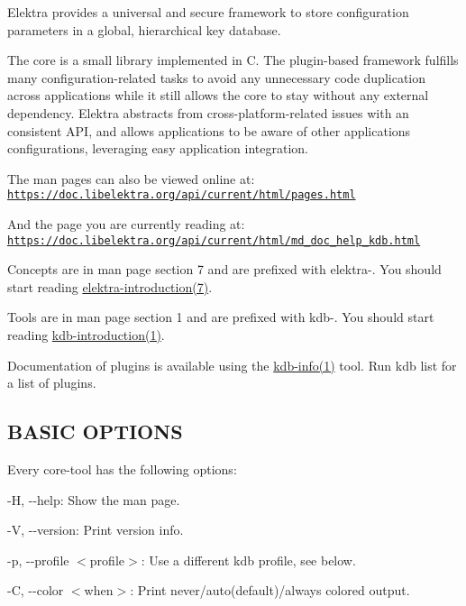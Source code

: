 Elektra provides a universal and secure framework to store configuration parameters in a global, hierarchical key database.

The core is a small library implemented in C. The plugin-\/based framework fulfills many configuration-\/related tasks to avoid any unnecessary code duplication across applications while it still allows the core to stay without any external dependency. Elektra abstracts from cross-\/platform-\/related issues with an consistent A\+PI, and allows applications to be aware of other applications\textquotesingle{} configurations, leveraging easy application integration.

The man pages can also be viewed online at\+: \href{https://doc.libelektra.org/api/current/html/pages.html}{\tt https\+://doc.\+libelektra.\+org/api/current/html/pages.\+html}

And the page you are currently reading at\+: \href{https://doc.libelektra.org/api/current/html/md_doc_help_kdb.html}{\tt https\+://doc.\+libelektra.\+org/api/current/html/md\+\_\+doc\+\_\+help\+\_\+kdb.\+html}

Concepts are in man page section 7 and are prefixed with {\ttfamily elektra-\/}. You should start reading \hyperlink{md_doc_help_elektra-introduction_doc_help_elektra-introduction_md}{elektra-\/introduction(7)}.

Tools are in man page section 1 and are prefixed with {\ttfamily kdb-\/}. You should start reading \hyperlink{md_doc_help_kdb-introduction_doc_help_kdb-introduction_md}{kdb-\/introduction(1)}.

Documentation of plugins is available using the \hyperlink{md_doc_help_kdb-info_doc_help_kdb-info_md}{kdb-\/info(1)} tool. Run {\ttfamily kdb list} for a list of plugins.

\subsection*{B\+A\+S\+IC O\+P\+T\+I\+O\+NS}

Every core-\/tool has the following options\+:


\begin{DoxyItemize}
\item {\ttfamily -\/H}, {\ttfamily -\/-\/help}\+: Show the man page.
\item {\ttfamily -\/V}, {\ttfamily -\/-\/version}\+: Print version info.
\item {\ttfamily -\/p}, {\ttfamily -\/-\/profile $<$profile$>$}\+: Use a different kdb profile, see below.
\item {\ttfamily -\/C}, {\ttfamily -\/-\/color $<$when$>$}\+: Print never/auto(default)/always colored output.
\end{DoxyItemize}

